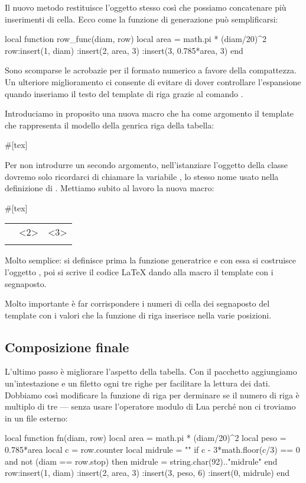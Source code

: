 Il nuovo metodo restituisce l'oggetto stesso così che possiamo concatenare più
inserimenti di cella. Ecco come la funzione di generazione può semplificarsi:
\begin{lines}
local function row_func(diam, row)
    local area = math.pi * (diam/20)^2
    row:insert(1, diam)
       :insert(2, area, 3)
       :insert(3, 0.785*area, 3)
end
\end{lines}

Sono scomparse le acrobazie per il formato numerico a favore della compattezza.
Un ulteriore miglioramento ci consente di evitare di dover controllare
l'espansione quando inseriamo il testo del template di riga grazie al comando
.

Introduciamo in proposito una nuova macro  che ha come argomento il
template che rappresenta il modello della genrica riga della tabella:
\begin{lines}
#[tex]
\newcommand{\printrow}[1]{\directlua{
local tmpl = [=[\detokenize{#1}]=]
for _, s in row:iter_template(tmpl) do
   tex.print(s)
end
}}
\end{lines}

Per non introdurre un secondo argomento, nell'istanziare l'oggetto della classe
 dovremo solo ricordarci di chiamare la variabile , lo stesso
nome usato nella definizione di . Mettiamo subito al lavoro la
nuova macro:
\begin{lines}
#[tex]
\begin{tabular}{lrr}
\printrow{\textbf{<1>} & <2> & <3>\\}
\end{tabular}
\end{lines}

Molto semplice: si definisce prima la funzione generatrice e con essa si
costruisce l'oggetto , poi si scrive il codice \LaTeX{} dando alla
macro  il template con i segnaposto.

Molto importante è far corrispondere i numeri di cella dei segnaposto del
template con i valori che la funzione di riga inserisce nella varie posizioni.


\subsection{Composizione finale}

L'ultimo passo è migliorare l'aspetto della tabella. Con il pacchetto
 aggiungiamo un'intestazione e un filetto ogni tre righe per
facilitare la lettura dei dati. Dobbiamo così modificare la funzione di riga per
derminare se il numero di riga è multiplo di tre --- senza usare l'operatore
modulo \key{\%} di Lua perché non ci troviamo in un file esterno:
\begin{lines}
local function fn(diam, row)
    local area = math.pi * (diam/20)^2
    local peso = 0.785*area
    local c = row.counter
    local midrule = ""
    if c - 3*math.floor(c/3) == 0
    and not (diam == row.stop) then
        midrule = string.char(92).."midrule"
    end
    row:insert(1, diam)
       :insert(2, area, 3)
       :insert(3, peso, 6)
       :insert(0, midrule)
end
\end{lines}


